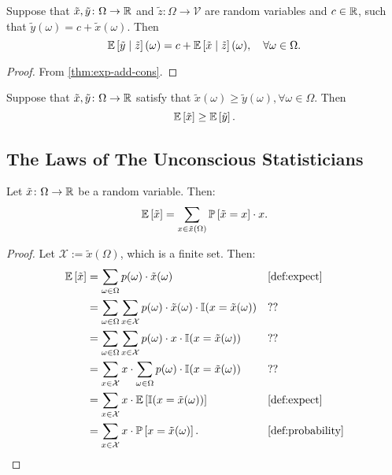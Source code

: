 \begin{theorem} \label{thm:exp-cnd-rv-add-cons}
Suppose that $\tilde{x}, \tilde{y} \colon \Omega \to \mathbb{R}$ and $\tilde{z}\colon \Omega \to \mathcal{V}$ are random variables and $c\in \mathbb{R}$, such that $\tilde{y}(\omega) = c + \tilde{x}(\omega)$. Then
\[
\mathbb{E} \left[ \tilde{y} \mid \tilde{z} \right](\omega) = c + \mathbb{E} \left[ \tilde{x} \mid  \tilde{z} \right](\omega), \quad \forall \omega \in \Omega.
\]
\end{theorem}
\begin{proof}
From \cref{thm:exp-add-cons}.
\end{proof}

\begin{theorem} \label{thm:exp-monotone}
  Suppose that $\tilde{x}, \tilde{y} \colon \Omega \to \mathbb{R}$ satisfy that $\tilde{x}(\omega) \ge \tilde{y}(\omega), \forall \omega \in \Omega$. Then
  \[
   \mathbb{E}\left[\tilde{x}\right] \ge \mathbb{E}\left[\tilde{y}\right] .
  \]
\end{theorem}
\subsection{The Laws of The Unconscious Statisticians}

\begin{theorem} \label{thm:exp-sum-val}
Let $\tilde{x} \colon \Omega \to \mathbb{R} $ be a random variable. Then:
\[
\mathbb{E} \left[ \tilde{x} \right]
=
\sum_{x\in \tilde{x}(\Omega)} \mathbb{P} \left[ \tilde{x} = x \right] \cdot  x. 
\]
\end{theorem}
\begin{proof}
Let $\mathcal{X} := \tilde{x}(\Omega)$, which is a finite set. Then:
\begin{align*}
\E \left[ \tilde{x} \right]
&= \sum_{\omega \in \Omega } p(\omega ) \cdot \tilde{x}(\omega) && \text{\cref{def:expect}} \\
&= \sum_{\omega \in \Omega } \sum_{x\in \mathcal{X}} p(\omega ) \cdot \tilde{x}(\omega) \cdot \I(x =  \tilde{x}(\omega)) && \text{??} \\
&= \sum_{\omega \in \Omega } \sum_{x\in \mathcal{X}} p(\omega ) \cdot x \cdot \I(x =  \tilde{x}(\omega)) && \text{??} \\
&= \sum_{x\in \mathcal{X}} x \cdot \sum_{\omega \in \Omega }  p(\omega ) \cdot  \I(x =  \tilde{x}(\omega))  && \text{??}\\
&= \sum_{x\in \mathcal{X}} x \cdot \E \left[  \I(x =  \tilde{x}(\omega)) \right] && \text{\cref{def:expect}} \\
&= \sum_{x\in \mathcal{X}} x \cdot \PP \left[x =  \tilde{x}(\omega) \right]. && \text{\cref{def:probability}} 
\end{align*}
\end{proof}

